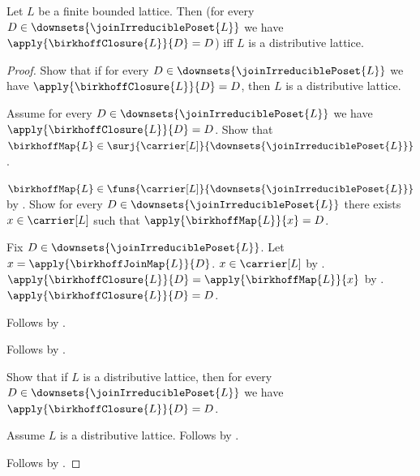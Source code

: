 \begin{theorem}\label{birkhoff_closure_identity_iff_distributive}
    Let $L$ be a finite bounded lattice.
    Then
        (for every $D\in\downsets{\joinIrreduciblePoset{L}}$ we have
            $\apply{\birkhoffClosure{L}}{D}=D$) iff
        $L$ is a distributive lattice.
\end{theorem}
\begin{proof}
    Show that if for every
        $D\in\downsets{\joinIrreduciblePoset{L}}$ we have
        $\apply{\birkhoffClosure{L}}{D}=D$, then
        $L$ is a distributive lattice.
    \begin{subproof}
        Assume for every $D\in\downsets{\joinIrreduciblePoset{L}}$ we
            have $\apply{\birkhoffClosure{L}}{D}=D$.
        Show that $\birkhoffMap{L}\in
            \surj{\carrier[L]}{\downsets{\joinIrreduciblePoset{L}}}$.
        \begin{subproof}
            $\birkhoffMap{L}\in
                \funs{\carrier[L]}
                    {\downsets{\joinIrreduciblePoset{L}}}$ by
                .
            Show for every $D\in\downsets{\joinIrreduciblePoset{L}}$
                there exists $x\in\carrier[L]$ such that
                    $\apply{\birkhoffMap{L}}{x}=D$.
            \begin{subproof}
                Fix $D\in\downsets{\joinIrreduciblePoset{L}}$.
                Let $x=\apply{\birkhoffJoinMap{L}}{D}$.
                $x\in\carrier[L]$ by
                    .
                $\apply{\birkhoffClosure{L}}{D}
                    =\apply{\birkhoffMap{L}}{x}$ by
                    .
                $\apply{\birkhoffClosure{L}}{D}=D$.
            \end{subproof}
            Follows by .
        \end{subproof}
        Follows by .
    \end{subproof}
    Show that if $L$ is a distributive lattice, then for every
        $D\in\downsets{\joinIrreduciblePoset{L}}$ we have
        $\apply{\birkhoffClosure{L}}{D}=D$.
    \begin{subproof}
        Assume $L$ is a distributive lattice.
        Follows by .
    \end{subproof}
    Follows by \auto.
\end{proof}

